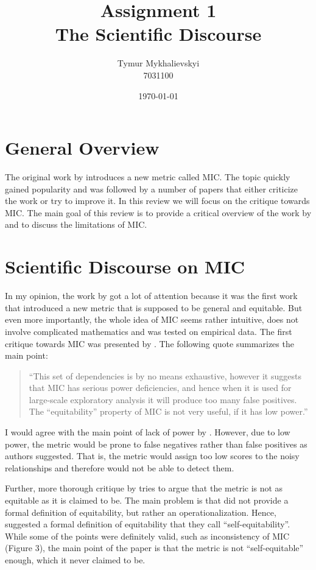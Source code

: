 \documentclass{article}
\title{\vspace{-2cm}Assignment 1\\
    The Scientific Discourse}
\author{Tymur Mykhalievskyi\\ 7031100}
\date{\today}
\begin{document}
\maketitle

\section{General Overview}
The original work by \cite{reshef2011} introduces a new metric called MIC. The topic quickly gained popularity and was followed by a number of papers that either criticize the work or try to improve it. In this review we will focus on the critique towards MIC. The main goal of this review is to provide a critical overview of the work by \cite{reshef2011} and to discuss the limitations of MIC. 

\section{Scientific Discourse on MIC}
In my opinion, the work by \cite{reshef2011} got a lot of attention because it was the first work that introduced a new metric that is supposed to be general and equitable. But even more importantly, the whole idea of MIC seems rather intuitive, does not involve complicated mathematics and was tested on empirical data. The first critique towards MIC was presented by \cite{simon2014}. The following quote summarizes the main point: 
\begin{quote}
    ``This set of dependencies is by no means exhaustive, however it suggests that MIC has serious power deficiencies, and hence when it is used for large-scale exploratory analysis it will produce too many false positives. The ``equitability'' property of MIC is not very useful, if it has low power.''
\end{quote}

I would agree with the main point of lack of power by \cite{simon2014}. However, due to low power, the metric would be prone to false negatives rather than false positives as authors suggested. That is, the metric would assign too low scores to the noisy relationships and therefore would not be able to detect them. 

Further, more thorough critique by \cite{kinney2014} tries to argue that the metric is not as equitable as it is claimed to be. The main problem is that \cite{reshef2011} did not provide a formal definition of equitability, but rather an operationalization. Hence, \cite{kinney2014} suggested a formal definition of equitability that they call ``self-equitability''. While some of the points were definitely valid, such as inconsistency of MIC \citep{kinney2014} (Figure 3), the main point of the paper is that the metric is not ``self-equitable'' enough, which it never claimed to be. 
\end{document}
